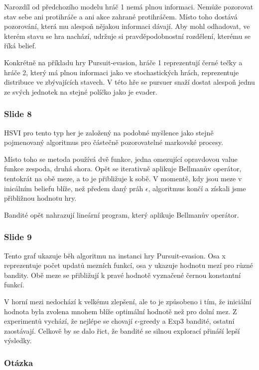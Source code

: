 \documentclass[11pt]{article}
\begin{document}
Narozdíl od předchozího modelu hráč 1 nemá plnou informaci.
Nemůže pozorovat stav sebe ani protihráče a ani akce zahrané protihráčem.
Místo toho dostává pozorování, která mu alespoň nějakou informaci dávají.
Aby mohl odhadovat, ve kterém stavu se hra nachází, udržuje si pravděpodobnostní rozdělení, kterému se říká belief.

Konkrétně na příkladu hry Pursuit-evasion, hráče 1 reprezentují černé tečky a hráče 2, který má plnou informaci jako ve stochastických hrách, reprezentuje distribuce ve zbývajících stavech.
V této hře se pursuer snaží dostat alespoň jednu ze svých jednotek na stejné políčko jako je evader.

\subsubsection*{Slide 8}
HSVI pro tento typ her je založený na podobné myšlence jako stejně pojmenovaný algoritmus pro částečně pozorovatelné markovské procesy.

Místo toho se metoda používá dvě funkce, jedna omezující opravdovou value funkce zespoda, druhá shora.
Opět se iterativně aplikuje Bellmanův operátor, tentokrát na obě meze, a to je přibližuje k sobě.
V momentě, kdy jsou meze v inicálním beliefu blíže, než předem daný práh $\epsilon$, algoritmus končí a získali jsme přibližnou hodnotu hry.

Bandité opět nahrazují lineární program, který aplikuje Bellmanův operátor.

\subsubsection*{Slide 9}
Tento graf ukazuje běh algoritmu na instanci hry Pursuit-evasion.
Osa x reprezentuje počet updatů mezních funkcí, osa y ukazuje hodnotu mezí pro různé bandity.
Obě meze se přibližují k pravé hodnotě vyznačené černou konstantní funkcí.

V horní mezi nedochází k velkému zlepšení, ale to je způsobeno i tím, že iniciální hodnota byla zvolena mnohem blíže optimální hodnotě než pro dolní mez.
Z experimentů vychází, že nejlépe se chovají $\epsilon$-greedy a Exp3 bandité, ostatní zaostávají.
Celkově by se dalo řict, že bandité se silnou explorací přináší lepší výsledky.

\subsubsection*{Otázka}
\end{document}
